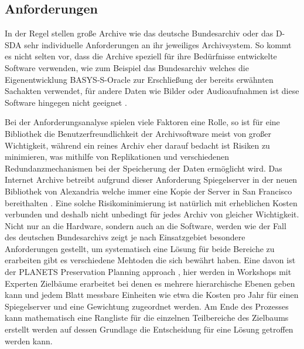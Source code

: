 \documentclass[conference,compsoc,final,a4paper]{IEEEtran}
\begin{document}
\subsection{Anforderungen}
In der Regel stellen große Archive wie das deutsche Bundesarchiv oder das \acs{D-SDA} sehr individuelle Anforderungen an ihr jeweiliges Archivsystem. So kommt es nicht selten vor, dass die Archive speziell für ihre Bedürfnisse entwickelte Software verwenden, wie zum Beispiel das Bundesarchiv welches die Eigenentwicklung BASYS-S-Oracle zur Erschließung der bereits erwähnten Sachakten verwendet, für andere Daten wie Bilder oder Audioaufnahmen ist diese Software hingegen nicht geeignet \autocite{Berger2005}.

Bei der Anforderungsanalyse spielen viele Faktoren eine Rolle, so ist für eine Bibliothek die Benutzerfreundlichkeit der Archivsoftware meist von großer Wichtigkeit, während ein reines Archiv eher darauf bedacht ist Risiken zu minimieren, was mithilfe von Replikationen und verschiedenen Redundanzmechanismen bei der Speicherung der Daten ermöglicht wird. Das Internet Archive betreibt aufgrund dieser Anforderung Spiegelserver in der neuen Bibliothek von Alexandria welche immer eine Kopie der Server in San Francisco bereithalten \autocite{BibAlexIAMirror}. Eine solche Risikominimierung ist natürlich mit erheblichen Kosten verbunden und deshalb nicht unbedingt für jedes Archiv von gleicher Wichtigkeit. Nicht nur an die Hardware, sondern auch an die Software, werden wie der Fall des deutschen Bundesarchivs zeigt je nach Einsatzgebiet besondere Anforderungen gestellt, um systematisch eine Lösung für beide Bereiche zu erarbeiten gibt es verschiedene Mehtoden die sich bewährt haben. Eine davon ist der PLANETS Preservation Planning approach \autocite{Strodl2007}, hier werden in Workshops mit Experten Zielbäume erarbeitet bei denen es mehrere hierarchische Ebenen geben kann und jedem Blatt messbare Einheiten wie etwa die Kosten pro Jahr für einen Spiegelserver und eine Gewichtung zugeordnet werden. Am Ende des Prozesses kann mathematisch eine Rangliste für die einzelnen Teilbereiche des Zielbaums erstellt werden auf dessen Grundlage die Entscheidung für eine Lösung getroffen werden kann.

\end{document}
